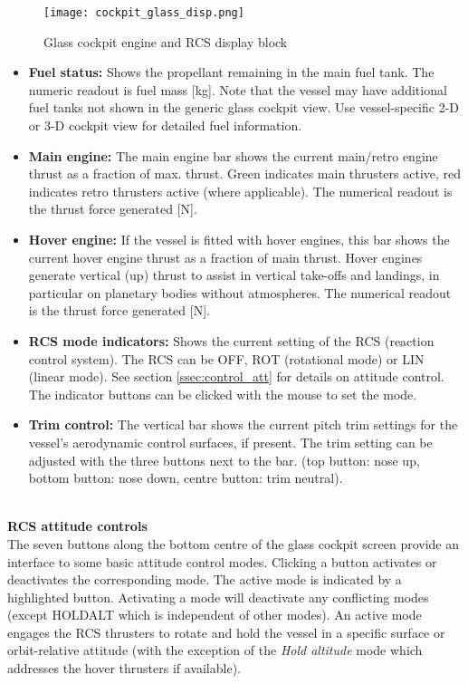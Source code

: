 \documentclass[Orbiter User Manual.tex]{subfiles}
\begin{document}
\begin{figure}[H]
  \centering
  \texttt{[image: cockpit\_glass\_disp.png]}
  \caption{Glass cockpit engine and RCS display block}
\end{figure}

\begin{itemize}
\item \textbf{Fuel status:} Shows the propellant remaining in the main fuel tank. The numeric readout is fuel mass [kg]. Note that the vessel may have additional fuel tanks not shown in the generic glass cockpit view. Use vessel-specific 2-D or 3-D cockpit view for detailed fuel information.
\item \textbf{Main engine:} The main engine bar shows the current main/retro engine thrust as a fraction of max. thrust. Green indicates main thrusters active, red indicates retro thrusters active (where applicable). The numerical readout is the thrust force generated [N]. 
\item \textbf{Hover engine:} If the vessel is fitted with hover engines, this bar shows the current hover engine thrust as a fraction of main thrust. Hover engines generate vertical (up) thrust to assist in vertical take-offs and landings, in particular on planetary bodies without atmospheres. The numerical readout is the thrust force generated [N].
\item \textbf{RCS mode indicators:} Shows the current setting of the RCS (reaction control system). The RCS can be OFF, ROT (rotational mode) or LIN (linear mode). See section \ref{ssec:control_att} for details on attitude control. The indicator buttons can be clicked with the mouse to set the mode.
\item \textbf{Trim control:} The vertical bar shows the current pitch trim settings for the vessel's aerodynamic control surfaces, if present. The trim setting can be adjusted with the three buttons next to the bar. (top button: nose up, bottom button: nose down, centre button: trim neutral).

\end{itemize}


\noindent
\\
\textbf{RCS attitude controls}\\
The seven buttons along the bottom centre of the glass cockpit screen provide an interface to some basic attitude control modes. Clicking a button activates or deactivates the corresponding mode. The active mode is indicated by a highlighted button. Activating a mode will deactivate any conflicting modes (except HOLDALT which is independent of other modes). An active mode engages the RCS thrusters to rotate and hold the vessel in a specific surface or orbit-relative attitude (with the exception of the \textit{Hold altitude} mode which addresses the hover thrusters if available).
\end{document}
